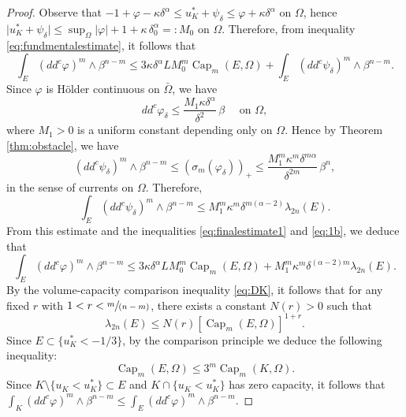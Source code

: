\documentclass[11pt]{article}
\numberwithin{equation}{section}
\newcommand{\spfrac}[2]{\sfrac{#1}{(#2)}}
\theoremstyle{definition}
\DeclareMathOperator{\Capa}{Cap}
\theoremstyle{plain}
\theoremstyle{definition}
\begin{document}
\begin{proof}
Observe that $-1 + \varphi - \kappa \delta^\alpha \leq u_K^* + \psi_\delta \leq \varphi + \kappa \delta^\alpha$ on $\Omega$, hence $\vert u_K^* + \psi_\delta\vert \leq \sup_{\Omega} \vert \varphi\vert + 1 + \kappa \, \delta_0^\alpha =: M_0$ on $\Omega$. Therefore, from inequality \eqref{eq:fundmentalestimate}, it follows that
\begin{equation} \label{eq:finalestimate1}
\int_{E}(dd^c\varphi)^m\wedge\beta^{n-m} \leq 3 \kappa \delta^\alpha L M_0^m \Capa_m (E,\Omega) + \int_{E}(dd^c\psi_{\delta})^m\wedge\beta^{n-m}.
\end{equation}
Since $\varphi$ is Hölder continuous on $\bar \Omega$, we have
\begin{equation}\label{eq:1a}
dd^c\varphi_{\delta}\leq\frac{M_1 \kappa \delta^\alpha}{\delta^{2}}\, \beta \quad\text{ on } \Omega,
\end{equation}
where $M_1 > 0$ is a uniform constant depending only on $\Omega$. Hence by Theorem \ref{thm:obstacle}, we have
\begin{equation}\label{eq:1b}
(dd^c\psi_{\delta})^m\wedge\beta^{n-m} \leq (\sigma_m (\varphi_{\delta}))_+ \leq\frac{M_1^m \kappa^m \delta^{m \alpha}}{\delta^{2 m}}\, \beta^n,
\end{equation}
in the sense of currents on $ \Omega$. Therefore,
\[
\int_{E}(dd^c\psi_{\delta})^m\wedge\beta^{n-m}\leq M_1^{m} \kappa^m \delta^{ m (\alpha -2)} \lambda_{2 n} (E).
\]
From this estimate and the inequalities \eqref{eq:finalestimate1} and \eqref{eq:1b}, we deduce that
\begin{equation} \label{eq:finalestimate2}
\int_{E}(dd^c\varphi)^m\wedge\beta^{n-m} \leq 3 \kappa \delta^{\alpha} L M_0^m \Capa_m (E,\Omega)+ M_1^{m} \kappa^m \delta^{(\alpha -2)m} \lambda_{2 n} (E).
\end{equation}
By the volume-capacity comparison inequality \eqref{eq:DK}, it follows that for any fixed $r$ with $1 < r < \spfrac{m}{n - m}$, there exists a constant $N (r) > 0$ such that
\begin{equation} \label{eq:volumeestimate}
\lambda_{2 n}(E) \leq N (r) [\Capa_m(E,\Omega)]^{1 + r}.
\end{equation}
Since $ E \subset\{u_K^* < - 1 \slash 3\}$, by the comparison principle we deduce the following inequality:
\begin{equation}\label{eq:2}
\Capa_m (E,\Omega) \leq 3^{m} \Capa_m (K,\Omega).
\end{equation}
Since $K \setminus \{u_K < u_K^*\} \subset E$ and $K \cap \{u_K < u_K^*\}$ has zero capacity, it follows that $\int_K (dd^c\varphi)^m\wedge\beta^{n-m} \leq \int_E (dd^c\varphi)^m\wedge\beta^{n-m}$.


\end{proof}
\end{document}

